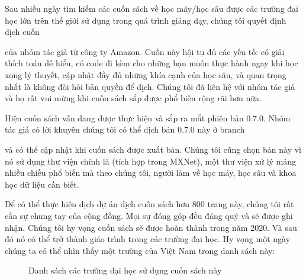 \documentclass[letterpaper,11pt,english]{sphinxmanual}
\begin{document}
Sau nhiều ngày tìm kiếm các cuốn sách về học máy/học sâu được các trường
đại học lớn trên thế giới sử dụng trong quá trình giảng dạy, chúng tôi
quyết định dịch cuốn %
\begin{footnote}[4]\sphinxAtStartFootnote
{}
%
\end{footnote}
của nhóm tác giả từ công ty Amazon. Cuốn này hội tụ đủ các yếu tố: có
giải thích toán dễ hiểu, có code đi kèm cho những bạn muốn thực hành
ngay khi học xong lý thuyết, cập nhật đầy đủ những khía cạnh của học
sâu, và quan trọng nhất là không đòi hỏi bản quyền để dịch. Chúng tôi đã
liên hệ với nhóm tác giả và họ rất vui mừng khi cuốn sách sắp được phổ
biến rộng rãi hơn nữa.

Hiện cuốn sách vẫn đang được thực hiện và sắp ra mắt phiên bản 0.7.0.
Nhóm tác giả có lời khuyên chúng tôi có thể dịch bản 0.7.0 này ở branch
%
\begin{footnote}[5]\sphinxAtStartFootnote
{}
%
\end{footnote} và có thể cập
nhật khi cuốn sách được xuất bản. Chúng tôi cũng chọn bản này vì nó sử
dụng thư viện chính là  (tích hợp trong MXNet), một thư viện xử
lý mảng nhiều chiều phổ biến mà theo chúng tôi, người làm về học máy,
học sâu và khoa học dữ liệu cần biết.

Để có thể thực hiện dịch dự án dịch cuốn sách hơn 800 trang này, chúng
tôi rất cần sự chung tay của cộng đồng. Mọi sự đóng góp đều đáng quý và
sẽ được ghi nhận. Chúng tôi hy vọng cuốn sách sẽ được hoàn thành trong
năm 2020. Và sau đó nó có thể trở thành giáo trình trong các trường đại
học. Hy vọng một ngày chúng ta có thể nhìn thấy một trường của Việt Nam
trong danh sách này:

\begin{figure}[H]
\centering
\capstart

\noindent{}
\caption{Danh sách các trường đại học sử dụng cuốn sách này}\label{\detokenize{intro_vn:id1}}\end{figure}
\end{document}

